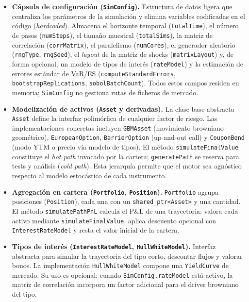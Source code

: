\begin{itemize}
  \item \textbf{Cápsula de configuración (\texttt{SimConfig}).}
  Estructura de datos ligera que centraliza los parámetros de la simulación y elimina variables codificadas en el código (\emph{hardcoded}).
  Almacena el horizonte temporal (\texttt{totalTime}), el número de pasos (\texttt{numSteps}), el tamaño muestral (\texttt{totalSims}), la matriz de correlación (\texttt{corrMatrix}), el paralelismo (\texttt{numCores}), el generador aleatorio (\texttt{rngType}, \texttt{rngSeed}), el \emph{layout} de la matriz de shocks (\texttt{matrixLayout}) y, de forma opcional, un modelo de tipos de interés (\texttt{rateModel}) y la estimación de errores estándar de VaR/ES (\texttt{computeStandardErrors}, \texttt{bootstrapReplications}, \texttt{sobolBatchCount}).
  Todos estos campos residen en memoria; \texttt{SimConfig} no gestiona rutas de ficheros de mercado.

  \item \textbf{Modelización de activos (\texttt{Asset} y derivadas).}
  La clase base abstracta \texttt{Asset} define la interfaz polimórfica de cualquier factor de riesgo.
  Las implementaciones concretas incluyen \texttt{GBMAsset} (movimiento browniano geométrico), \texttt{EuropeanOption}, \texttt{BarrierOption} (up-and-out call) y \texttt{CouponBond} (modo YTM o precio vía modelo de tipos).
  El método \texttt{simulateFinalValue} constituye el \emph{hot path} invocado por la cartera;  \texttt{generatePath} se reserva para tests y análisis (\emph{cold path}).
  Esta jerarquía permite que el motor sea agnóstico respecto al modelo estocástico de cada instrumento.

  \item \textbf{Agregación en cartera (\texttt{Portfolio}, \texttt{Position}).}
  \texttt{Portfolio} agrupa posiciones (\texttt{Position}), cada una con un \texttt{shared\_ptr<Asset>} y una cantidad.
  El método \texttt{simulatePathPnL} calcula el P\&L de una trayectoria: valora cada activo mediante \texttt{simulateFinalValue}, aplica descuento opcional con \texttt{InterestRateModel} y resta el valor inicial de la cartera.

  \item \textbf{Tipos de interés (\texttt{InterestRateModel}, \texttt{HullWhiteModel}).}
  Interfaz abstracta para simular la trayectoria del tipo corto, descontar flujos y valorar bonos.
  La implementación \texttt{HullWhiteModel} compone una \texttt{YieldCurve} de mercado.
  Su uso es opcional: cuando \texttt{SimConfig.rateModel} está activo, la matriz de correlación incorpora un factor adicional para el driver browniano del tipo.


\end{itemize}

